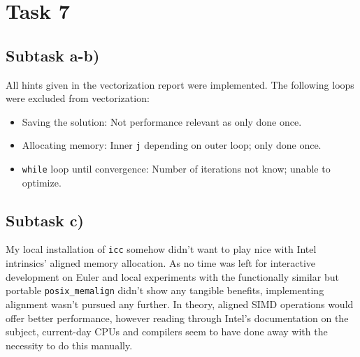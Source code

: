 \documentclass[11pt,a4paper]{article}
\begin{document}
\section{Task 7}

\subsection{Subtask a-b)}
All hints given in the vectorization report were implemented.
The following loops were excluded from vectorization:
\begin{itemize}
	\item Saving the solution: Not performance relevant as only done once.
	\item Allocating memory: Inner \texttt{j} depending on outer loop; only done once.
	\item \texttt{while} loop until convergence: Number of iterations not know; unable to optimize.
\end{itemize}
	
\subsection{Subtask c)}
My local installation of \texttt{icc} somehow didn't want to play nice with Intel intrinsics' aligned memory allocation.
As no time was left for interactive development on Euler and local experiments with the functionally similar but portable \texttt{posix\_memalign}
didn't show any tangible benefits, implementing alignment wasn't pursued any further.
In theory, aligned SIMD operations would offer better performance, however reading through Intel's documentation on the subject, current-day CPUs and compilers seem to have done away
with the necessity to do this manually.
\end{document}
